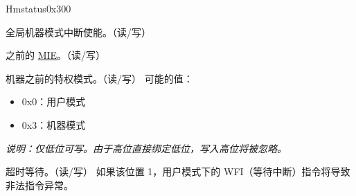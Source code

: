 \begin{register}{H}{mstatus}{0x300}\label{regdesc:MSTATUS}
%
%
%
%
%
%
%
%
%
\regnewline%
\begin{regdesc}\begin{reglist}
\label{fielddesc:MSTATUSMIE}\item [MIE] 全局机器模式中断使能。（读/写）
\label{fielddesc:MSTATUSMPIE}\item [MPIE] 之前的 \hyperref[fielddesc:MSTATUSMIE]{MIE}。（读/写）
\label{fielddesc:MSTATUSMPP}\item [MPP] 机器之前的特权模式。（读/写）
\newline 可能的值：
\begin{itemize}
    \setlength\itemsep{-1em}
    \item 0x0：用户模式
    \item 0x3：机器模式
\end{itemize}
\textit{说明：仅低位可写。由于高位直接绑定低位，写入高位将被忽略。}
\label{fielddesc:MSTATUSTW}\item [TW] 超时等待。（读/写）
\newline 如果该位置 1，用户模式下的 WFI（等待中断）指令将导致非法指令异常。
\end{reglist}\end{regdesc}
\end{register}

